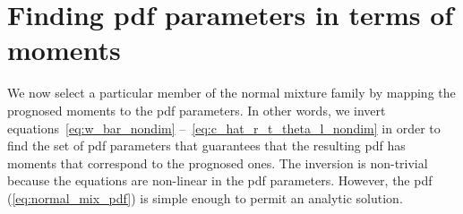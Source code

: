 \section{Finding pdf parameters in terms of moments}\label{sec:pdfparams}

We now select a particular member of the normal mixture family
by mapping the prognosed moments to the \gls{pdf} parameters.
In other words, we invert equations~\eqref{eq:w_bar_nondim} --~\eqref{eq:c_hat_r_t_theta_l_nondim}
in order to find the set of \gls{pdf} parameters
that guarantees that the resulting \gls{pdf} has moments that correspond to the prognosed ones.
The inversion is non-trivial because the equations are non-linear in the \gls{pdf} parameters.
However, the \gls{pdf} (\cref{eq:normal_mix_pdf}) is simple enough to permit an analytic solution.

